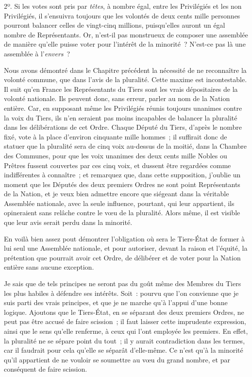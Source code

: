 \documentclass[french,twoside]{book} %
\begin{document}
2º. Si les votes sont pris par {\itshape têtes}, à nombre égal, entre les Privilégiés et les non Privilégiés, il s’ensuivra toujours que les volontés de deux cents mille personnes pourront balancer celles de vingt-cinq millions, puisqu’elles auront un égal nombre de Représentants. Or, n’est-il pas monstrueux de composer une assemblée de manière qu’elle puisse voter pour l’intérêt de la minorité ? N’est-ce pas là une assemblée à l’{\itshape envers} ?\par
Nous avons démontré dans le Chapitre précédent la nécessité de ne reconnaître la volonté commune, que dans l’avis de la pluralité. Cette maxime est incontestable. Il suit qu’en France les Représentants du Tiers sont les vrais dépositaires de la volonté nationale. Ils peuvent donc, sans erreur, parler au nom de la Nation entière. Car, en supposant même les Privilégiés réunis toujours unanimes contre la voix du Tiers, ils n’en seraient pas moins incapables de balancer la pluralité dans les délibérations de cet Ordre. Chaque Député du Tiers, d’après le nombre fixé, vote à la place d’environ cinquante mille hommes ; il suffirait donc de statuer que la pluralité sera de cinq voix au-dessus de la moitié, dans la Chambre des Communes, pour que les voix unanimes des deux cents mille Nobles ou Prêtres fussent couvertes par ces cinq voix, et dussent être regardées comme indifférentes à connaître ; et remarquez que, dans cette supposition, j’oublie un moment que les Députés des deux premiers Ordres ne sont point Représentants de la Nation, et je veux bien admettre encore que siégeant dans la véritable Assemblée nationale, avec la seule influence, pourtant, qui leur appartient, ils opineraient sans relâche contre le vœu de la pluralité. Alors même, il est visible que leur avis serait perdu dans la minorité.\par
En voilà bien assez pout démontrer l’obligation où sera le Tiers-État de former à lui seul une Assemblée nationale, et pour autoriser, devant la raison et l’équité, la prétention que pourrait avoir cet Ordre, de délibérer et de voter pour la Nation entière sans aucune exception.\par
Je sais que de tels principes ne seront pas du goût même des Membres du Tiers les plus habiles à défendre ses intérêts. Soit : pourvu que l’on convienne que je suis parti des vrais principes, et que je ne marche qu’à l’appui d’une bonne logique. Ajoutons que le Tiers-État, en se séparant des deux premiers Ordres, ne peut pas être accusé de faire scission ; il faut laisser cette imprudente expression, ainsi que le sens qu’elle renferme, à ceux qui l’ont employée les premiers. En effet, la pluralité ne se sépare point du tout ; il y aurait contradiction dans les termes, car il faudrait pour cela qu’elle se séparât d’elle-même. Ce n’est qu’à la minorité qu’il appartient de ne vouloir se soumettre au vœu du grand nombre, et par conséquent de faire scission.\par
\end{document}
